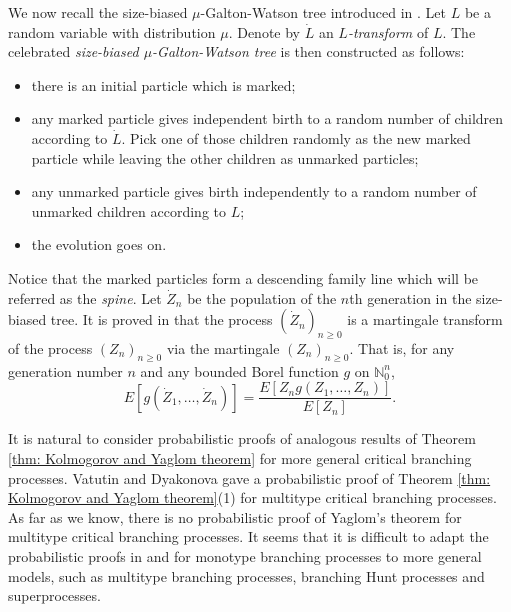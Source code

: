 \documentclass[UTF8]{pkuthss}
\theoremstyle{plain}
\theoremstyle{definition}
\numberwithin{equation}{section}
\begin{document}
We now recall the size-biased $\mu$-Galton-Watson tree introduced in \cite{LyonsPemantlePeres1995Conceptual}.
Let $L$ be a random variable with distribution $\mu$.
Denote by $\dot L$ an \emph{$L$-transform} of $L$.
The celebrated \emph{size-biased $\mu$-Galton-Watson tree} is then constructed as follows:
\begin{itemize}
	\item
	there is an initial particle which is marked;
	\item
	any marked particle gives independent birth to a random number of children according to $\dot L$. Pick one of those children randomly as the new marked particle while leaving the other children as unmarked particles;
	\item
	any unmarked particle gives
	birth independently to a random number of unmarked children according to $L$;
	\item
	the evolution goes on.
\end{itemize}

Notice that the marked particles form a descending family line which will be referred as the \emph{spine}.
Let $\dot Z_n$ be the population of the $n$th generation in the size-biased tree.
It is proved in \cite{LyonsPemantlePeres1995Conceptual} that the process $(\dot Z_n)_{n\ge 0}$ is a martingale transform of the process $(Z_n)_{n\ge 0}$ via the martingale $(Z_n)_{n\ge 0}.$
That is, for any generation number $n$ and any bounded Borel function $g$ on $\mathbb N_0^{n}$,
\begin{equation}
\label{eq:htransformation}
E [ g ( \dot Z_1, \dots, \dot Z_n) ]
= \frac { E[ Z_n g( Z_1, \dots, Z_n)]} {E [ Z_n]}.
\end{equation}

It is natural to consider probabilistic proofs of analogous results of Theorem \ref{thm: Kolmogorov and Yaglom theorem} for more general critical branching processes.
Vatutin and  Dyakonova \cite{VatutinDyakonova2001The-survival} gave a probabilistic proof of Theorem \ref{thm: Kolmogorov and Yaglom theorem}(1) for multitype critical branching processes.
As far as we know, there is no probabilistic proof of Yaglom's theorem for multitype critical branching processes.
It seems that it is difficult to adapt the probabilistic proofs in \cite{Geiger2000A-new} and \cite{LyonsPemantlePeres1995Conceptual} for monotype branching processes to more general models, such as multitype branching processes, branching Hunt processes and superprocesses.
\end{document}
